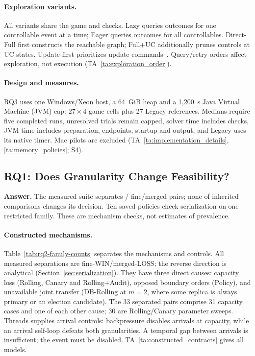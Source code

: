 \documentclass[acmsmall,screen,review,anonymous]{acmart}
\begin{document}
\paragraph{Exploration variants.}
All variants share the game and checks. Lazy queries outcomes for one controllable event at a time; Eager queries outcomes for all controllables. Direct-Full first constructs the reachable graph; Full+UC additionally prunes controls at UC states. Update-first prioritizes update commands~\cite{HiranoEtAl2024ODUCS}. Query/retry orders affect exploration, not execution (TA~\ref{ta:exploration_order}).

\paragraph{Design and measures.}
RQ3 uses one Windows/Xeon host, a 64~GiB heap and a 1,200~s Java Virtual Machine (JVM) cap: $27\times4$ game cells plus 27 Legacy references. Medians require five completed runs, unresolved trials remain capped, solver time includes checks, JVM time includes preparation, endpoints, startup and output, and Legacy uses its native timer. Mac pilots are excluded (TA~\ref{ta:implementation_details}, \ref{ta:memory_policies}; S4).

\subsection{RQ1: Does Granularity Change Feasibility?}
\label{sec:claim-granularity}
\label{sec:rq2}
\textbf{Answer.} The measured suite separates \VThreeESixWitness{}/\VThreeESixMainPairs{} fine/merged pairs; none of \VThreeEOneTrials{} inherited comparisons changes its decision. Ten saved policies check serialization on one restricted family. These are mechanism checks, not estimates of prevalence.


\paragraph{Constructed mechanisms.}
Table~\ref{tab:rq2-family-counts} separates the mechanisms and controls. All measured separations are fine-WIN/merged-LOSS; the reverse direction is analytical (Section~\ref{sec:serialization}). They have three direct causes: capacity loss (Rolling, Canary and Rolling+Audit), opposed boundary orders (Policy), and unavailable joint transfer (DB-Rolling at $m=2$, where some replica is always primary or an election candidate). The 33 separated pairs comprise 31 capacity cases and one of each other cause; 30 are Rolling/Canary parameter sweeps. Threads supplies arrival controls: backpressure disables arrivals at capacity, while an arrival self-loop defeats both granularities. A temporal gap between arrivals is insufficient; the event must be disabled. TA~\ref{ta:constructed_contracts} gives all models.
\end{document}
